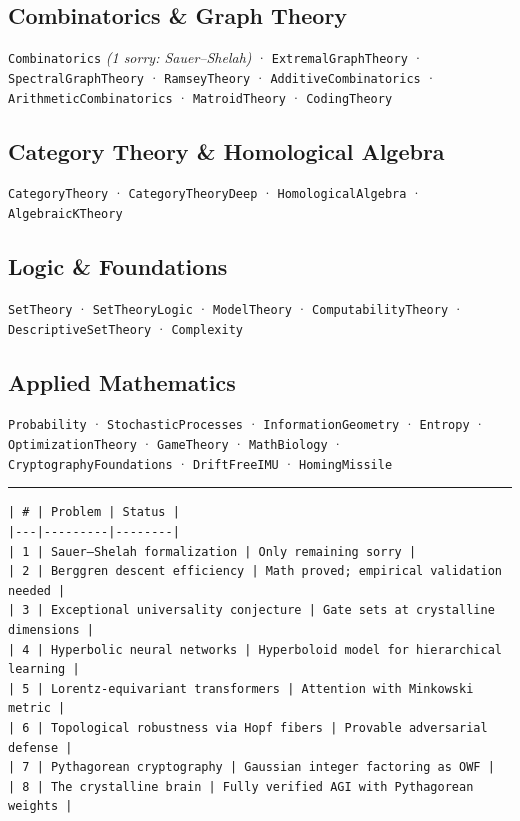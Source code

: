 \documentclass[12pt,a4paper,openany]{book}
\begin{document}
\subsection{Combinatorics \& Graph Theory}
\texttt{Combinatorics} \textit{(1 sorry: Sauer–Shelah)} · \texttt{ExtremalGraphTheory} · \texttt{SpectralGraphTheory} · \texttt{RamseyTheory} · \texttt{AdditiveCombinatorics} · \texttt{ArithmeticCombinatorics} · \texttt{MatroidTheory} · \texttt{CodingTheory}

\subsection{Category Theory \& Homological Algebra}
\texttt{CategoryTheory} · \texttt{CategoryTheoryDeep} · \texttt{HomologicalAlgebra} · \texttt{AlgebraicKTheory}

\subsection{Logic \& Foundations}
\texttt{SetTheory} · \texttt{SetTheoryLogic} · \texttt{ModelTheory} · \texttt{ComputabilityTheory} · \texttt{DescriptiveSetTheory} · \texttt{Complexity}

\subsection{Applied Mathematics}
\texttt{Probability} · \texttt{StochasticProcesses} · \texttt{InformationGeometry} · \texttt{Entropy} · \texttt{OptimizationTheory} · \texttt{GameTheory} · \texttt{MathBiology} · \texttt{CryptographyFoundations} · \texttt{DriftFreeIMU} · \texttt{HomingMissile}

\bigskip\hrule\bigskip


\begin{verbatim}
| # | Problem | Status |
|---|---------|--------|
| 1 | Sauer–Shelah formalization | Only remaining sorry |
| 2 | Berggren descent efficiency | Math proved; empirical validation needed |
| 3 | Exceptional universality conjecture | Gate sets at crystalline dimensions |
| 4 | Hyperbolic neural networks | Hyperboloid model for hierarchical learning |
| 5 | Lorentz-equivariant transformers | Attention with Minkowski metric |
| 6 | Topological robustness via Hopf fibers | Provable adversarial defense |
| 7 | Pythagorean cryptography | Gaussian integer factoring as OWF |
| 8 | The crystalline brain | Fully verified AGI with Pythagorean weights |
\end{verbatim}
\end{document}
